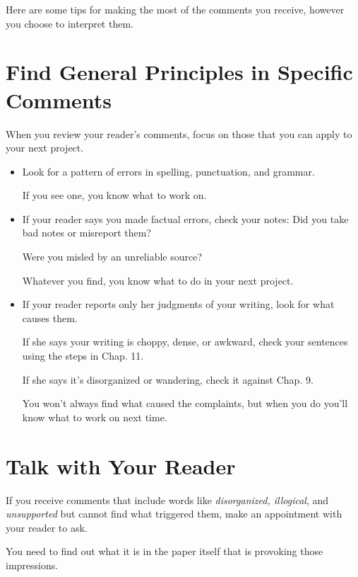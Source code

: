 \documentclass[oneside]{book}
\numberwithin{equation}{section}
\begin{document}
%
Here are some tips for making the most of the comments you receive, however you choose to interpret them.

\section{Find General Principles in Specific Comments}
When you review your reader's comments, focus on those that you can apply to your next project.
\begin{itemize}
    \item Look for a pattern of errors in spelling, punctuation, and grammar.
    
    If you see one, you know what to work on.
    \item If your reader says you made factual errors, check your notes: Did you take bad notes or misreport them?
    
    Were you misled by an unreliable source?
    
    Whatever you find, you know what to do in your next project.
    \item If your reader reports only her judgments of your writing, look for what causes them.
    
    If she says your writing is choppy, dense, or awkward, check your sentences using the steps in Chap. 11.
    
    If she says it's disorganized or wandering, check it against Chap. 9.
    
    You won't always find what caused the complaints, but when you do you'll know what to work on next time.
\end{itemize}

\section{Talk with Your Reader}
If you receive comments that include words like \textit{disorganized, illogical}, and \textit{unsupported} but cannot find what triggered them, make an appointment with your reader to ask.


You need to find out what it is in the paper itself that is provoking those impressions.
\end{document}
